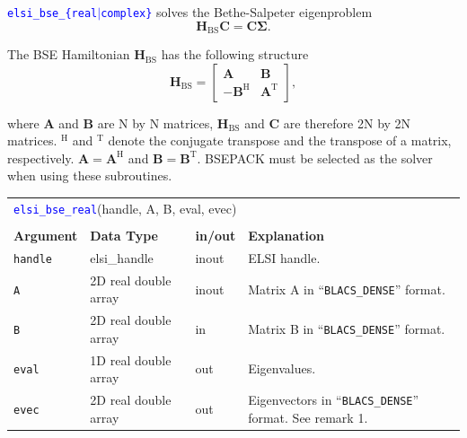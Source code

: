 \documentclass{report}
\newcommand{\api}[1]{\textcolor{blue}{\texttt{#1}}}
\begin{document}
\api{elsi\_bse\_\{real$\vert$complex\}} solves the Bethe-Salpeter eigenproblem
\begin{equation}
\boldsymbol{H}_\text{BS} \boldsymbol{C} = \boldsymbol{C} \boldsymbol{\Sigma}.
\end{equation}

The BSE Hamiltonian $\boldsymbol{H}_\text{BS}$ has the following structure
\begin{equation}
\boldsymbol{H}_\text{BS} =
\begin{bmatrix}
\boldsymbol{A} & \boldsymbol{B}\\
-\boldsymbol{B}^\text{H} & \boldsymbol{A}^\text{T}
\end{bmatrix},
\end{equation}

where $\boldsymbol{A}$ and $\boldsymbol{B}$ are N by N matrices, $\boldsymbol{H}_\text{BS}$ and $\boldsymbol{C}$ are therefore 2N by 2N matrices. $^\text{H}$ and $^\text{T}$ denote the conjugate transpose and the transpose of a matrix, respectively. $\boldsymbol{A} = \boldsymbol{A}^\text{H}$ and $\boldsymbol{B} = \boldsymbol{B}^\text{T}$. BSEPACK must be selected as the solver when using these subroutines.

\begin{tabular}[]{|p{20mm}|p{40mm}|p{10mm}|p{92mm}|}
\multicolumn{4}{l}{\api{elsi\_bse\_real}(handle, A, B, eval, evec)}\\
\multicolumn{4}{l}{}\\
\hline
\multicolumn{1}{|l|}{\textbf{Argument}} & \multicolumn{1}{l|}{\textbf{Data Type}} & \multicolumn{1}{l|}{\textbf{in/out}} & \multicolumn{1}{l|}{\textbf{Explanation}}\\
\hline
\texttt{handle} & elsi\_handle         & inout & ELSI handle.\\
\hline
\texttt{A}      & 2D real double array & inout & Matrix A in ``\texttt{BLACS\_DENSE}'' format.\\
\hline
\texttt{B}      & 2D real double array & in    & Matrix B in ``\texttt{BLACS\_DENSE}'' format.\\
\hline
\texttt{eval}   & 1D real double array & out   & Eigenvalues.\\
\hline
\texttt{evec}   & 2D real double array & out   & Eigenvectors in ``\texttt{BLACS\_DENSE}'' format. See remark 1.\\
\hline
\end{tabular}
\end{document}
